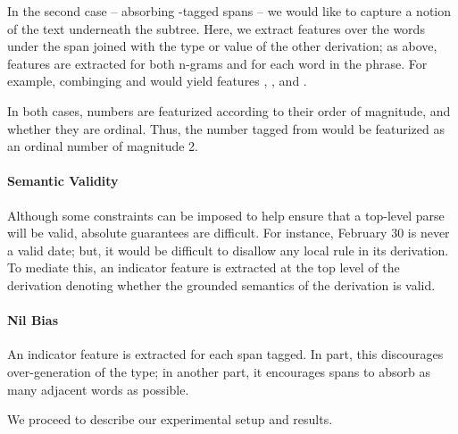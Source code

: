 In the second case -- absorbing -tagged spans -- 
  we would like to capture a notion of the text underneath
  the subtree.
Here, we extract features over the words under the  span joined with
  the type or value of the other derivation;
  as above, features are extracted for both n-grams and for each word in
  the phrase.
For example, combinging  and  would yield features
  ,
  , and
  .

In both cases, numbers are featurized according to their order of magnitude,
  and whether they are ordinal.
Thus, the number tagged from  would be featurized as an
  ordinal number of magnitude 2.

\paragraph{Semantic Validity}
Although some constraints can be imposed to help ensure that a top-level parse
  will be valid, absolute guarantees are difficult.
For instance, February 30 is never a valid date; but, it would be difficult
  to disallow any local rule in its derivation.
To mediate this, an indicator feature is extracted at the top level of the
  derivation denoting whether the grounded semantics of the derivation is
  valid.

\paragraph{Nil Bias}
An indicator feature is extracted for each  span tagged.
In part, this discourages over-generation of the type; in another part,
  it encourages  spans to absorb as many adjacent words as possible.


We proceed to describe our experimental setup and results.
